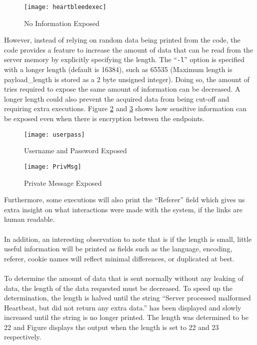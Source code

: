 \documentclass[a4paper,12pt]{article}
\begin{document}
\begin{figure}[H]
\centering
\texttt{[image: heartbleedexec]}
\caption{No Information Exposed}
\label{fig:noimptinfo}
\end{figure}

\noindent However, instead of relying on random data being printed from the code, the code provides a feature to increase the amount of data that can be read from the server memory by explicitly specifying the length. The ``\texttt{-l}'' option is specified with a longer length (default is 16384), such as 65535 (Maximum length is payload\_length is stored as a 2 byte unsigned integer). Doing so, the amount of tries required to expose the same amount of information can be decreased. A longer length could also prevent the acquired data from being cut-off and requiring extra executions. Figure \ref{fig:userpass} and \ref{fig:privmsg} shows how sensitive information can be exposed even when there is encryption between the endpoints.

\begin{figure}[H]
\centering
\texttt{[image: userpass]}
\caption{Username and Password Exposed}
\label{fig:userpass}
\end{figure}

\begin{figure}[H]
\centering
\texttt{[image: PrivMsg]}
\caption{Private Message Exposed}
\label{fig:privmsg}
\end{figure}
\noindent Furthermore, some executions will also print the ``Referer'' field which gives us extra insight on what interactions were made with the system, if the links are human readable.\\\\In addition, an interesting observation to note that is if the length is small, little useful information will be printed as fields such as the language, encoding, referer, cookie names will reflect minimal differences, or duplicated at best.
\\\\To determine the amount of data that is sent normally without any leaking of data, the length of the data requested must be decreased. To speed up the determination, the length is halved until the string ``Server processed malformed Heartbeat, but did not return any extra data.'' has been displayed and slowly increased until the string is no longer printed. The length was determined to be 22 and Figure displays the output when the length is set to 22 and 23 respectively.
\end{document}
